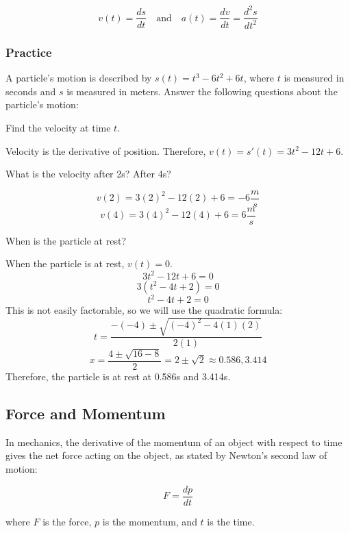 \begin{equation}
v(t) = \frac{ds}{dt} \quad \text{and} \quad a(t) = \frac{dv}{dt} = \frac{d^2s}{dt^2}
\end{equation}

\subsubsection{Practice}

A particle's motion is described by $s(t) = t^3-6t^2+6t$, where $t$ is measured 
in seconds and $s$ is measured in meters. Answer the following questions about 
the particle's motion:
\begin{Exercise}[label=velacc1]
Find the velocity at time $t$.
\end{Exercise}

\begin{Answer}[ref=velacc1]
Velocity is the derivative of position. Therefore, $v(t) = s'(t) = 3t^2-12t+6$.
\end{Answer}

\begin{Exercise}[label=velacc2]
What is the velocity after 2s? After 4s?
\end{Exercise}

\begin{Answer}[ref=velacc2]
$$v(2) = 3(2)^2-12(2)+6=-6 \frac{m}{s}$$
$$v(4) = 3(4)^2-12(4)+6=6\frac{m}{s}$$
\end{Answer}

\begin{Exercise}[label=velacc3]
When is the particle at rest?
\end{Exercise}

\begin{Answer}[ref=velacc3]
When the particle is at rest, $v(t) = 0$. 
$$3t^2-12t+6=0$$
$$3(t^2-4t+2)=0$$
$$t^2-4t+2=0$$
This is not easily factorable, so we will use the quadratic formula: $$t=\frac{-(-4)\pm\sqrt{(-4)^2-4(1)(2)}}{2(1)}$$
$$x=\frac{4\pm\sqrt{16-8}}{2}=2\pm\sqrt{2}\approx0.586, 3.414$$
Therefore, the particle is at rest at 0.586s and 3.414s.
\end{Answer}

\subsection{Force and Momentum}

In mechanics, the derivative of the momentum of an object with respect to time gives the net force acting on the object, as stated by Newton's second law of motion:

\begin{equation}
F = \frac{dp}{dt}
\end{equation}

where $F$ is the force, $p$ is the momentum, and $t$ is the time.
